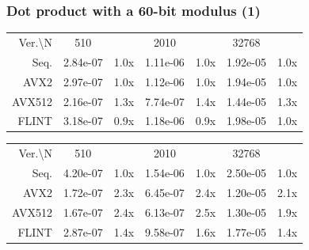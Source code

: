 \documentclass[10pt]{beamer}
\begin{document}
\begin{frame}
    \frametitle{Dot product with a 60-bit modulus (1)}

    \begin{table}[h!]
        \centering
        
        \begin{tabular}{|r|*{3}{c c|}}
            \hline
            \rowcolor{myGray} 
            \multicolumn{7}{|c|}{\textsc{Cascade Lake}} \\
    
            \hline
            \rowcolor{myGray}
            Ver.\textbackslash N & 510 & & 2010 & & 32768 & \\
            \hline
            \cellcolor{myGray} Seq. & 2.84e-07 & 1.0x & 1.11e-06 & 1.0x & 1.92e-05 & 1.0x \\
            \hline
            \cellcolor{myGray} AVX2 & 2.97e-07 & 1.0x & 1.12e-06 & 1.0x & 1.94e-05 & 1.0x \\
            \hline
            \cellcolor{myGray} AVX512 & 2.16e-07 & 1.3x & 7.74e-07 & 1.4x & 1.44e-05 & 1.3x \\
            \hline
            \cellcolor{myGray} FLINT & 3.18e-07 & 0.9x & 1.18e-06 & 0.9x & 1.98e-05 & 1.0x \\
            \hline
        \end{tabular}
    
        \begin{tabular}{|r|*{3}{c c|}}
            \hline
            \rowcolor{myGray} 
            \multicolumn{7}{|c|}{\textsc{Ice Lake}} \\
    
            \hline
            \rowcolor{myGray}
            Ver.\textbackslash N & 510 & & 2010 & & 32768 & \\
            \hline
            \cellcolor{myGray} Seq. & 4.20e-07 & 1.0x & 1.54e-06 & 1.0x & 2.50e-05 & 1.0x \\
            \hline
            \cellcolor{myGray} AVX2 & 1.72e-07 & 2.3x & 6.45e-07 & 2.4x & 1.20e-05 & 2.1x \\
            \hline
            \cellcolor{myGray} AVX512 & 1.67e-07 & 2.4x & 6.13e-07 & 2.5x & 1.30e-05 & 1.9x \\
            \hline
            \cellcolor{myGray} FLINT & 2.87e-07 & 1.4x & 9.58e-07 & 1.6x & 1.77e-05 & 1.4x \\
            \hline
        \end{tabular}
    

\end{table}
\end{frame}
\end{document}

